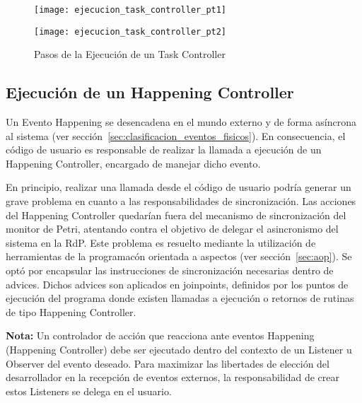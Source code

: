 \begin{figure}[H]
	\centering
	\texttt{[image: ejecucion\_task\_controller\_pt1]}
\end{figure}
\begin{figure}[H]
	\centering
	\texttt{[image: ejecucion\_task\_controller\_pt2]}
	\caption{Pasos de la Ejecución de un Task Controller}
	\label{fig:ejecucion_task_controller}
\end{figure}

\newpage

\subsection{Ejecución de un Happening Controller}
\label{sec:ejecucion_happening_controller}
Un Evento Happening se desencadena en el mundo externo y de forma asíncrona al
sistema (ver sección~\ref{sec:clasificacion_eventos_fisicos}). 
En consecuencia, el código de usuario es responsable de realizar la llamada a
ejecución de un Happening Controller, encargado de manejar dicho evento.

En principio, realizar una llamada desde el código de usuario podría generar un
grave problema en cuanto a las responsabilidades de sincronización. Las
acciones del Happening Controller quedarían fuera del mecanismo de
sincronización del monitor de Petri, atentando contra el objetivo de delegar
el asincronismo del sistema en la RdP.
Este problema es resuelto mediante la utilización de herramientas de la
programacón orientada a aspectos (ver sección~\ref{sec:aop}). Se optó por
encapsular las instrucciones de sincronización necesarias dentro de advices.
Dichos advices son aplicados en joinpoints, definidos por los puntos de
ejecución del programa donde existen llamadas a ejecución o retornos de
rutinas de tipo Happening Controller.

\begin{framed}
\textbf{Nota:}
	Un controlador de acción que reacciona ante
	eventos Happening (Happening Controller) debe ser ejecutado dentro del
	contexto de un Listener u Observer del evento deseado.
	Para maximizar las libertades de elección del desarrollador en la recepción de
	eventos externos, la responsabilidad de crear estos Listeners se delega en el
	usuario.
\end{framed}


